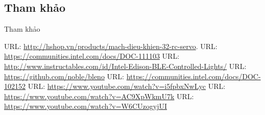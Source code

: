 \documentclass[compress, blue, 13pt,hyperref={pdfpagemode=FullScreen}]{beamer}
\begin{document}
\subsection{Tham khảo}
\begin{frame}{Tham khảo}
\begin{thebibliography}{39}
URL: \url{http://hshop.vn/products/mach-dieu-khien-32-rc-servo}.
URL: \url{https://communities.intel.com/docs/DOC-111103}
URL: \url{http://www.instructables.com/id/Intel-Edison-BLE-Controlled-Lights/}
URL: \url{https://github.com/noble/bleno}
URL: 
\url{https://communities.intel.com/docs/DOC-102152}
URL: \url{https://www.youtube.com/watch?v=i5fpbxNwLyc}
URL: \url{https://www.youtube.com/watch?v=AC9XpWkmU7k}
URL: \url{https://www.youtube.com/watch?v=W6CUzogyjUI}
\end{thebibliography}
\end{frame}
\section*{}
\begin{frame}
\transdissolve
\begin{center}
\begin{Huge}
\color{blue}{Cảm ơn các thầy/cô đã lắng nghe}
\end{Huge}
\end{center}
\end{frame}
\end{document}
